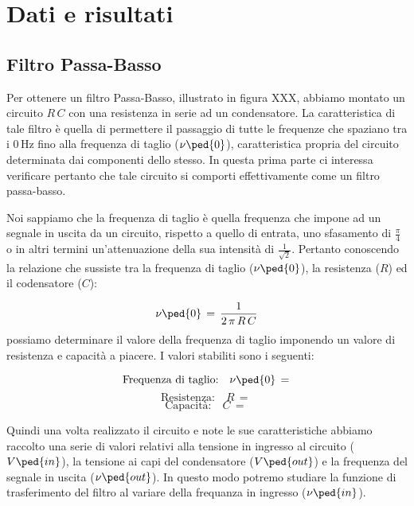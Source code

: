 \section*{Dati e risultati}

\subsection*{Filtro Passa-Basso}

Per ottenere un filtro Passa-Basso, illustrato in figura XXX, abbiamo montato un circuito $R\,C$ con una resistenza in serie ad un condensatore.
La caratteristica di tale filtro è quella di permettere il passaggio di tutte le frequenze che spaziano tra i $0\,\si{\hertz}$ fino alla frequenza di taglio ($\nu\ped{0}$), caratteristica propria del circuito determinata dai componenti dello stesso.
In questa prima parte ci interessa verificare pertanto che tale circuito si comporti effettivamente come un filtro passa-basso.

Noi sappiamo che la frequenza di taglio è quella frequenza che impone ad un segnale in uscita da un circuito, rispetto a quello di entrata, uno sfasamento di $\frac{\pi}{4}$ o in altri termini un'attenuazione della sua intensità di $\frac{1}{\sqrt{2}}$.
Pertanto conoscendo la relazione che sussiste tra la frequenza di taglio ($\nu\ped{0}$), la resistenza ($R$) ed il codensatore ($C$):

\begin{equation}
	\nu\ped{0} \,=\, \frac{1}{2\,\pi\,R\,C}
	\label{eq:taglio basso}
\end{equation}
%
possiamo determinare il valore della frequenza di taglio imponendo un valore di resistenza e capacità a piacere. I valori stabiliti sono i seguenti:

\begin{equation*}
	\text{Frequenza di taglio:} \quad \nu\ped{0} \,=\,
\end{equation*}
\begin{equation*}
	\text{Resistenza:} \quad R \,=\,
\end{equation*}
\begin{equation*}
	\text{Capacità:} \quad C \,=\,
\end{equation*}

Quindi una volta realizzato il circuito e note le sue caratteristiche abbiamo raccolto una serie di valori relativi alla tensione in ingresso al circuito ($V\ped{in}$), la tensione ai capi del condensatore ($V\ped{out}$) e la frequenza del segnale in uscita ($\nu\ped{out}$).
In questo modo potremo studiare la funzione di trasferimento del filtro al variare della frequanza in ingresso ($\nu\ped{in}$).

